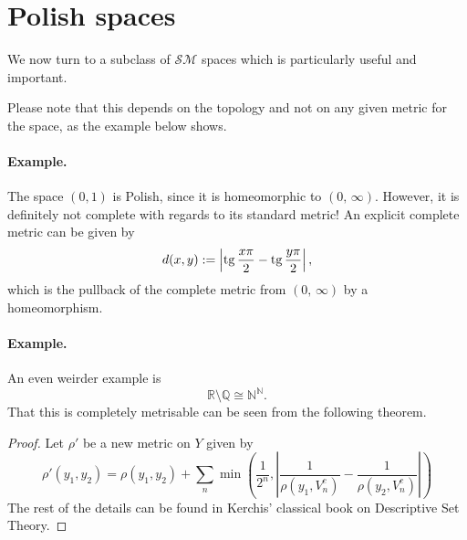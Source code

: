 \section{Polish spaces}
We now turn to a subclass of \( \mathcal{SM} \) spaces which is particularly useful and important.


Please note that this depends on the topology and not on any given metric for the space, as the example below shows.

\paragraph{Example.} The space \( (0,1) \) is Polish, since it is homeomorphic to \( (0,\,\infty) \). However, it is definitely not complete with regards to its standard metric! An explicit complete metric can be given by 
\[ 
    d(x, y) := \left| \operatorname{tg} \frac{x\pi}{2} - \operatorname{tg} \frac{y\pi}{2} \right|,
\]
which is the pullback of the complete metric from \( (0,\,\infty) \) by a homeomorphism.

\paragraph{Example.} An even weirder example is
\[ 
    \mathbb{R} \setminus \mathbb{Q} \cong \mathbb{N}^{ \mathbb{N} }.
\]
That this is completely metrisable can be seen from the following theorem.


\begin{proof}
Let \( \rho' \) be a new metric on \( Y \) given by
\[ 
    \rho'(y_1, y_2) = \rho(y_1, y_2) + \sum_n \min \left( \frac{1}{2^n}, \left| \frac{1}{\rho(y_1, V_n^c)} - \frac{1}{\rho(y_2, V_n^c)} \right|  \right) 
\]
The rest of the details can be found in Kerchis' classical book on Descriptive Set Theory.
\end{proof}


